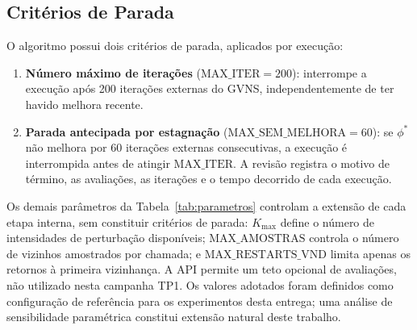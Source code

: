 \documentclass[12pt,a4paper]{article}
\begin{document}
\subsection{Critérios de Parada}

O algoritmo possui dois critérios de parada, aplicados por execução:

\begin{enumerate}
    \item \textbf{Número máximo de iterações} ($\text{MAX\_ITER} = 200$):
    interrompe a execução após 200 iterações externas do GVNS,
    independentemente de ter havido melhora recente.

    \item \textbf{Parada antecipada por estagnação}
    ($\text{MAX\_SEM\_MELHORA} = 60$): se $\phi^*$ não melhora por 60
    iterações externas consecutivas, a execução é interrompida antes de
    atingir $\text{MAX\_ITER}$. A revisão registra o motivo de término,
    as avaliações, as iterações e o tempo decorrido de cada execução.
\end{enumerate}

Os demais parâmetros da Tabela~\ref{tab:parametros} controlam a extensão
de cada etapa interna, sem constituir critérios de parada:
$K_{\max}$ define o número de intensidades de perturbação disponíveis;
$\text{MAX\_AMOSTRAS}$ controla o número de vizinhos amostrados por chamada;
e $\text{MAX\_RESTARTS\_VND}$ limita apenas os retornos à primeira vizinhança.
A API permite um teto opcional de avaliações, não utilizado nesta campanha TP1.
Os valores adotados foram definidos como configuração de referência para
os experimentos desta entrega; uma análise de sensibilidade paramétrica
constitui extensão natural deste trabalho.




\end{document}
